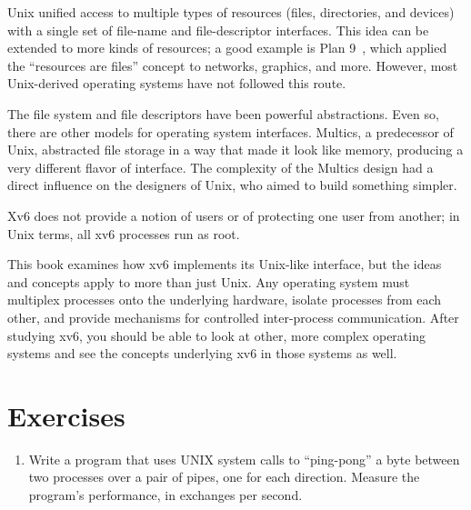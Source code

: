 Unix unified access to multiple types of resources (files,
directories, and devices) with a single set of 
file-name and file-descriptor interfaces.
This idea can be extended to more kinds of resources;
a good example is Plan 9~\cite{Presotto91plan9},
which applied the ``resources are files''
concept to 
networks, graphics, and more.
However, most Unix-derived operating systems have
not followed this route.

The file system and file descriptors have been  powerful
abstractions.
Even so, there are other models for operating system interfaces.
Multics, a predecessor of Unix,
abstracted file storage in a way that made it look like memory,
producing a very different flavor of interface.
The complexity of the Multics design had a direct influence
on the designers of Unix, who aimed to build something simpler.

Xv6 does not provide a notion of users or of protecting
one user from another; in Unix terms, all xv6 processes
run as root.

This book examines how xv6 implements its Unix-like interface,
but the ideas and concepts apply to more than just Unix.
Any operating system must multiplex processes onto
the underlying hardware, isolate processes from each
other, and provide mechanisms for controlled
inter-process communication.
After studying xv6, you should be able to
look at other, more complex operating systems
and see the concepts underlying xv6 in those systems as well.

\section{Exercises}

\begin{enumerate}

\item Write a program that uses UNIX system calls to
``ping-pong'' a byte between two processes over a pair
of pipes, one for each direction. Measure the
program's performance, in exchanges per second.

\end{enumerate}
